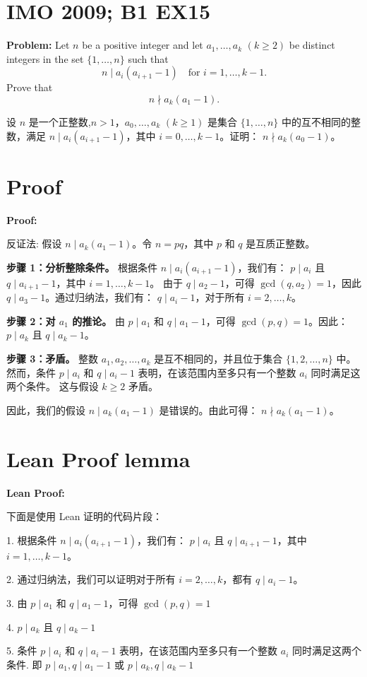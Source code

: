 \documentclass[a4paper]{article}
\begin{document}
\section*{IMO 2009; B1 EX15}
    \textbf{Problem:}
    Let $n$ be a positive integer and let $a_1,\ldots,a_k$ $(k \geq 2)$ be distinct integers in the set $\{1,\ldots,n\}$ such that 
    \[n \mid a_i(a_{i+1}-1) \quad \text{for } i = 1,\ldots,k-1.\]
    Prove that 
    \[n \nmid a_k(a_1-1).\]

    \[ \]
    设 $n$ 是一个正整数,$n > 1$，$a_0, \ldots, a_k$ $(k \geq 1)$ 是集合 $\{1, \ldots, n\}$ 中的互不相同的整数，满足
    $n \mid a_i(a_{i+1}-1)$，其中 $i = 0, \ldots, k-1$。证明：
    $n \nmid a_k(a_0-1)$。


\section*{Proof}
    \textbf{Proof:}

    反证法: 假设 $n \mid a_k(a_1-1)$。令 $n = pq$，其中 $p$ 和 $q$ 是互质正整数。

    \textbf{步骤 1：分析整除条件。}  
    根据条件 $n \mid a_i(a_{i+1}-1)$，我们有：
    $p \mid a_i$ 且 $q \mid a_{i+1}-1$，其中 $i = 1, \ldots, k-1$。
    由于 $q \mid a_2-1$，可得 $\gcd(q, a_2) = 1$，因此 $q \mid a_3-1$。通过归纳法，我们有：
    $q \mid a_i-1$，对于所有 $i = 2, \ldots, k$。

    \textbf{步骤 2：对 $a_1$ 的推论。}  
    由 $p \mid a_1$ 和 $q \mid a_1-1$，可得 $\gcd(p, q) = 1$。因此：
    $p \mid a_k$ 且 $q \mid a_k-1$。

    \textbf{步骤 3：矛盾。}  
    整数 $a_1, a_2, \ldots, a_k$ 是互不相同的，并且位于集合 $\{1, 2, \ldots, n\}$ 中。
    然而，条件 $p \mid a_i$ 和 $q \mid a_i-1$ 表明，在该范围内至多只有一个整数 $a_i$ 同时满足这两个条件。
    这与假设 $k \geq 2$ 矛盾。

    因此，我们的假设 $n \mid a_k(a_1-1)$ 是错误的。由此可得：
    $n \nmid a_k(a_1-1)$。

\section*{Lean Proof lemma}
    \textbf{Lean Proof:}

    下面是使用 Lean 证明的代码片段：

    1. 根据条件 $n \mid a_i(a_{i+1}-1)$，我们有：
    $p \mid a_i$ 且 $q \mid a_{i+1}-1$，其中 $i = 1, \ldots, k-1$。

    2. 通过归纳法，我们可以证明对于所有 $i = 2, \ldots, k$，都有 $q \mid a_i-1$。

    3. 由 $p \mid a_1$ 和 $q \mid a_1-1$，可得 $\gcd(p, q) = 1$

    4. $p \mid a_k$ 且 $q \mid a_k-1$

    5. 条件 $p \mid a_i$ 和 $q \mid a_i-1$ 表明，在该范围内至多只有一个整数 $a_i$ 同时满足这两个条件.
    即 $p \mid a_1, q \mid a_1-1$ 或 $p \mid a_k, q \mid a_k-1$
    
\end{document}
